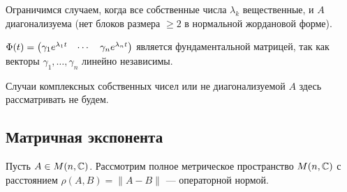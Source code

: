 \documentclass[a4paper]{report}
\begin{document}
    Ограничимся случаем, когда все собственные числа $\lambda_k$ вещественные, и $A$ диагонализуема (нет блоков размера $\ge 2$ в нормальной жордановой форме).

    $\Phi(t) = \begin{pmatrix}\gamma_1 e^{\lambda_1 t} & \cdots & \gamma_n e^{\lambda_n t}\end{pmatrix}$ является фундаментальной матрицей, так как векторы $\gamma_1, \dots, \gamma_n$ линейно независимы.

    Случаи комплексных собственных чисел или не диагонализуемой $A$ здесь рассматривать не будем.

    \subsection{Матричная экспонента}
    Пусть $A \in M(n, \mathbb{C})$.
    Рассмотрим полное метрическое пространство $M(n, \mathbb{C})$ с расстоянием $\rho(A, B) = \|A - B\|$ --- операторной нормой.
\end{document}
